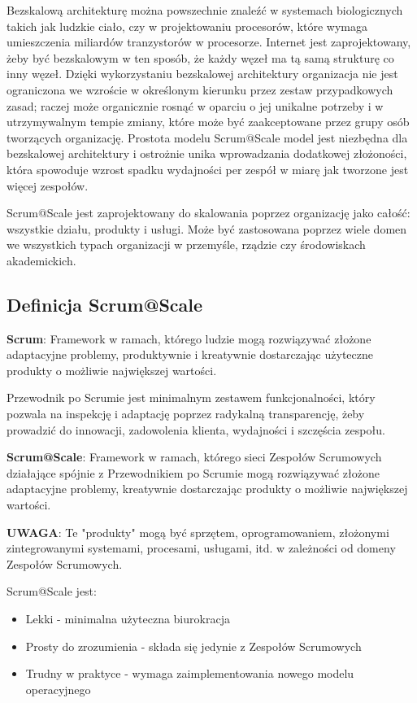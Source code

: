 \documentclass[12pt,a4paper,parskip=full]{scrartcl}
\begin{document}
Bezskalową architekturę można powszechnie znaleźć w systemach biologicznych takich jak ludzkie ciało, czy w projektowaniu procesorów, które wymaga umieszczenia miliardów tranzystorów w procesorze. Internet jest zaprojektowany, żeby być bezskalowym w ten sposób, że każdy węzeł ma tą samą strukturę co inny węzeł. Dzięki wykorzystaniu bezskalowej architektury organizacja nie jest ograniczona we wzroście w określonym kierunku przez zestaw przypadkowych zasad; raczej może organicznie rosnąć w oparciu o jej unikalne potrzeby i w utrzymywalnym tempie zmiany, które może być zaakceptowane przez grupy osób tworzących organizację. Prostota modelu Scrum@Scale model jest niezbędna dla  bezskalowej architektury i ostrożnie unika wprowadzania dodatkowej złożoności, która spowoduje wzrost spadku wydajności per zespół w miarę jak tworzone jest więcej zespołów.

Scrum@Scale jest zaprojektowany do skalowania poprzez organizację jako całość: wszystkie działu, produkty i usługi. Może być zastosowana poprzez wiele domen we wszystkich typach organizacji w przemyśle, rządzie czy środowiskach akademickich.

\subsection{Definicja Scrum@Scale}

\textbf{Scrum}: Framework w ramach, którego ludzie mogą rozwiązywać złożone adaptacyjne problemy, produktywnie i kreatywnie dostarczając użyteczne produkty o możliwie największej wartości.

Przewodnik po Scrumie jest minimalnym zestawem funkcjonalności, który pozwala na inspekcję i adaptację poprzez radykalną transparencję, żeby prowadzić do innowacji, zadowolenia klienta, wydajności i szczęścia zespołu.

\textbf{Scrum@Scale}: Framework w ramach, którego sieci Zespołów Scrumowych działające spójnie z Przewodnikiem po Scrumie mogą rozwiązywać złożone adaptacyjne problemy, kreatywnie dostarczając  produkty o możliwie największej wartości.

\textbf{UWAGA}: Te "produkty" mogą być sprzętem, oprogramowaniem, złożonymi zintegrowanymi systemami, procesami, usługami, itd. w zależności od domeny Zespołów Scrumowych.

Scrum@Scale jest:
\begin{itemize}
	\item Lekki - minimalna użyteczna biurokracja
	\item Prosty do zrozumienia - składa się jedynie z Zespołów Scrumowych
	\item Trudny w praktyce - wymaga zaimplementowania nowego modelu operacyjnego
\end{itemize}
\end{document}
